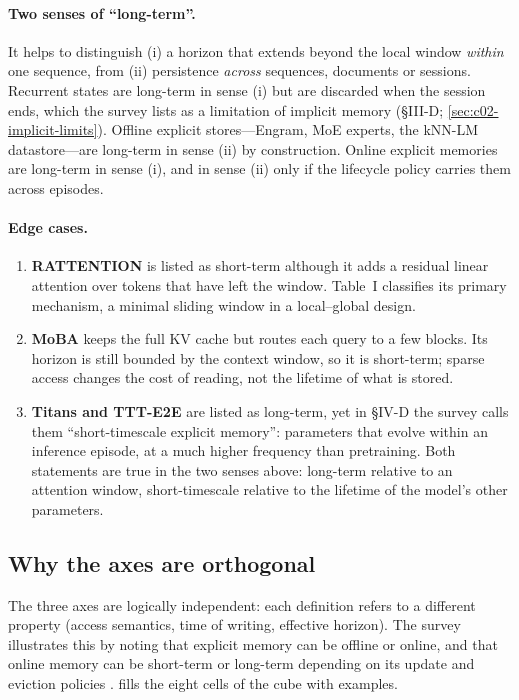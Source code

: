 \paragraph{Two senses of ``long-term''.} It helps to distinguish (i) a horizon that extends beyond
the local window \emph{within} one sequence, from (ii) persistence \emph{across} sequences,
documents or sessions. Recurrent states are long-term in sense (i) but are discarded when the
session ends, which the survey lists as a limitation of implicit memory
(\S III-D; \cref{sec:c02-implicit-limits}). Offline explicit stores---Engram, MoE experts, the
kNN-LM datastore---are long-term in sense (ii) by construction. Online explicit memories are
long-term in sense (i), and in sense (ii) only if the lifecycle policy carries them across
episodes.

\paragraph{Edge cases.}
\begin{enumerate}
  \item \textbf{RATTENTION} \citep{wang2025rattention} is listed as short-term although it adds a
        residual linear attention over tokens that have left the window. Table~I classifies its
        primary mechanism, a minimal sliding window in a local--global design.
  \item \textbf{MoBA} \citep{lu2025moba} keeps the full KV cache but routes each query to a few
        blocks. Its horizon is still bounded by the context window, so it is short-term; sparse
        access changes the cost of reading, not the lifetime of what is stored.
  \item \textbf{Titans and TTT-E2E} are listed as long-term, yet in \S IV-D the survey calls them
        ``short-timescale explicit memory'': parameters that evolve within an inference episode,
        at a much higher frequency than pretraining. Both statements are true in the two senses
        above: long-term relative to an attention window, short-timescale relative to the
        lifetime of the model's other parameters.
\end{enumerate}

\subsection{Why the axes are orthogonal}\label{sec:c02-orthogonal}

The three axes are logically independent: each definition refers to a different property
(access semantics, time of writing, effective horizon). The survey illustrates this by noting
that explicit memory can be offline or online, and that online memory can be short-term or
long-term depending on its update and eviction policies \citep[\S II-C]{zhoubian2026memory}.
 fills the eight cells of the cube with examples.

